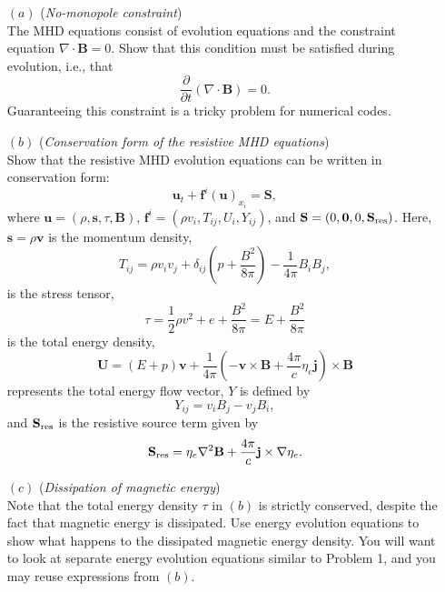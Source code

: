 \documentclass[letter,11pt]{article}
\begin{document}
\begin{itemize}
  	\item[$(a)$] (\emph{No-monopole constraint})\\
  		The MHD equations consist of evolution equations and the constraint equation $\nabla\cdot \mathbf{B}=0$. Show that this condition must be satisfied during evolution, i.e., that
  		\begin{equation} 
    		\frac{\partial}{\partial t}(\nabla\cdot\mathbf{B}) = 0.
		\end{equation}
		Guaranteeing this constraint is a tricky problem for numerical codes.

	\item[$(b)$] (\emph{Conservation form of the resistive MHD equations})\\
    	Show that the resistive MHD evolution equations can be written in conservation form:
   		\begin{equation}
      		\mathbf{u}_t + \mathbf{f}^i(\mathbf{u})_{x_i} = \mathbf{S}, \label{eq:Euler_prim}
    	\end{equation}
    	where $\mathbf{u}=(\rho, \mathbf{s}, \tau, \mathbf{B})$, $\mathbf{f}^i = (\rho v_i, T_{ij}, U_i, Y_{ij})$, and $\mathbf{S}= (0,\mathbf{0},0,\mathbf{S}_{\rm res})$. Here, $\mathbf{s}=\rho\mathbf{v}$ is the momentum density,
    	\begin{equation}
    		T_{ij} = \rho v_iv_j + \delta_{ij} \left(p + \frac{B^2}{8\pi}\right) - \frac{1}{4\pi}B_iB_j,
    	\end{equation}
    	is the stress tensor,
    	\begin{equation}
    		\tau = \frac{1}{2}\rho v^2 + e +  \frac{B^2}{8\pi} = E + \frac{B^2}{8\pi}
    	\end{equation}
    	is the total energy density,
    	\begin{equation}
    		\mathbf{U} = (E + p)\mathbf{v} + \frac{1}{4\pi}\left(-\mathbf{v}\times \mathbf{B} + \frac{4\pi}{c}\eta_e \mathbf{j}\right) \times \mathbf{B}
    	\end{equation}
    	represents the total energy flow vector, $Y$ is defined by
    	\begin{equation}
    		Y_{ij} = v_iB_j - v_j B_i,
    	\end{equation}
    	and $\mathbf{S}_{\rm res}$ is the resistive source term given by
    	\begin{equation}
    		\mathbf{S}_{\rm res} = \eta_e \nabla^2\mathbf{B} + \frac{4\pi}{c}\mathbf{j}\times \nabla \eta_e.
    	\end{equation}

    \item[$(c)$] (\emph{Dissipation of magnetic energy})\\
    	Note that the total energy density $\tau$ in $(b)$ is strictly conserved, despite the fact that magnetic energy is dissipated. Use energy evolution equations to show what happens to the dissipated magnetic energy density. You will want to look at separate energy evolution equations similar to Problem 1, and you may reuse expressions from $(b)$.

\end{itemize}
\end{document}
